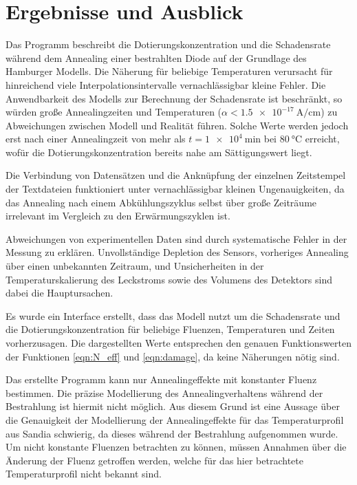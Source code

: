 \chapter{Ergebnisse und Ausblick}
Das Programm beschreibt die Dotierungskonzentration und die Schadensrate während dem
Annealing einer bestrahlten Diode
auf der Grundlage des Hamburger Modells. Die Näherung für beliebige
Temperaturen verursacht für hinreichend viele Interpolationsintervalle
vernachlässigbar kleine Fehler. Die Anwendbarkeit des Modells zur Berechnung der Schadensrate ist
beschränkt, so würden große Annealingzeiten und Temperaturen ($\alpha < \SI{1.5e-17}{\ampere\per\centi\meter}$) zu Abweichungen
zwischen Modell und Realität führen. Solche Werte werden jedoch erst nach
einer Annealingzeit von mehr als $t=\SI{1e4}{\minute}$ bei $\SI{80}{\celsius}$ erreicht, wofür
die Dotierungskonzentration bereits nahe am Sättigungswert liegt.

Die Verbindung von Datensätzen und die Anknüpfung der einzelnen Zeitstempel der
Textdateien funktioniert unter vernachlässigbar kleinen Ungenauigkeiten, da das Annealing
nach einem Abkühlungszyklus selbst über große Zeiträume irrelevant im Vergleich zu
den Erwärmungszyklen ist.

Abweichungen von experimentellen Daten sind durch systematische Fehler in der Messung
zu erklären. Unvollständige Depletion des Sensors, vorheriges Annealing über einen
unbekannten Zeitraum, und Unsicherheiten in der Temperaturskalierung des Leckstroms sowie
des Volumens des Detektors sind dabei die Hauptursachen.

Es wurde ein Interface erstellt, dass das Modell nutzt um die Schadensrate und die Dotierungskonzentration
für beliebige Fluenzen, Temperaturen und
Zeiten vorherzusagen. Die dargestellten Werte entsprechen den genauen Funktionswerten
der Funktionen \ref{eqn:N_eff} und \ref{eqn:damage}, da keine Näherungen nötig sind.


Das erstellte Programm kann nur Annealingeffekte mit konstanter Fluenz
bestimmen. Die präzise Modellierung des Annealingverhaltens während der Bestrahlung
ist hiermit nicht möglich.
Aus diesem Grund ist eine Aussage über die Genauigkeit der Modellierung der
Annealingeffekte für das Temperaturprofil aus Sandia schwierig, da dieses während der Bestrahlung
aufgenommen wurde.
Um nicht konstante Fluenzen betrachten zu können, müssen Annahmen
über die Änderung der Fluenz getroffen werden, welche für das
hier betrachtete Temperaturprofil nicht bekannt sind.

